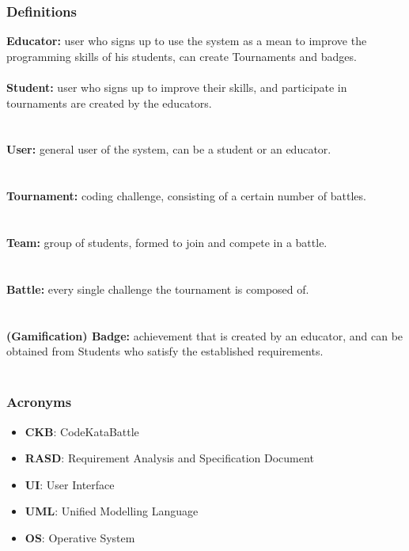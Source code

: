 \documentclass{article}
\begin{document}
\subsubsection{Definitions}
\textbf{Educator:} user who signs up to use the system as a mean to improve the programming skills of his students, can create Tournaments
and badges.\\\\
\textbf{Student:} user who signs up to improve their skills, and participate in tournaments are created by the educators. \\\\\\
\textbf{User:} general user of the system, can be a student or an educator. \\\\\\
\textbf{Tournament:} coding challenge, consisting of a certain number of battles.\\\\\\
\textbf{Team:} group of students, formed to join and compete in a battle.\\\\\\
\textbf{Battle:} every single challenge the tournament is composed of. \\\\\\
\textbf{(Gamification) Badge:} achievement that is created by an educator, and can be obtained from Students who satisfy the established requirements.\\\\

\subsubsection{Acronyms}
\begin{itemize}
    \item \textbf{CKB}: CodeKataBattle
    \item \textbf{RASD}: Requirement Analysis and Specification Document
    \item \textbf{UI}: User Interface
    \item \textbf{UML}: Unified Modelling Language
    \item \textbf{OS}: Operative System
\end{itemize}
\end{document}
